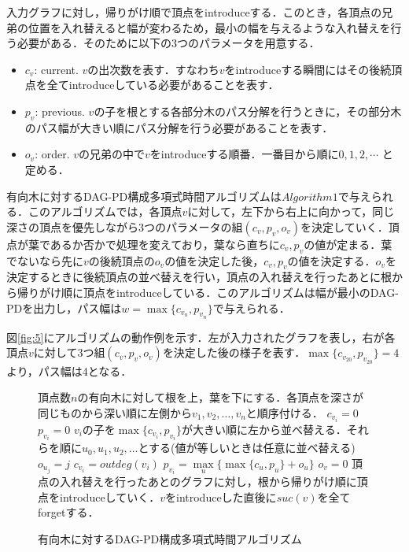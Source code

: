 \documentclass{kuisthesis}           %
\begin{document}
 入力グラフに対し，帰りがけ順で頂点をintroduceする．このとき，各頂点の兄弟の位置を入れ替えると幅が変わるため，最小の幅を与えるような入れ替えを行う必要がある．そのために以下の3つのパラメータを用意する．

 \begin{itemize}
     \item $c_v$: current. $v$の出次数を表す．すなわち$v$をintroduceする瞬間にはその後続頂点を全てintroduceしている必要があることを表す．
     \item $p_v$: previous. $v$の子を根とする各部分木のパス分解を行うときに，その部分木のパス幅が大きい順にパス分解を行う必要があることを表す．
     \item $o_v$: order. $v$の兄弟の中で$v$をintroduceする順番．一番目から順に$0, 1, 2, \cdots$ と定める．
 \end{itemize}
 
 有向木に対するDAG-PD構成多項式時間アルゴリズムは$Algorithm1$で与えられる．このアルゴリズムでは，各頂点$v$に対して，左下から右上に向かって，同じ深さの頂点を優先しながら3つのパラメータの組$(c_v, p_v, o_v)$を決定していく．頂点が葉であるか否かで処理を変えており，葉なら直ちに$c_v, p_v$の値が定まる．葉でないなら先に$v$の後続頂点の$o_v$の値を決定した後，$c_v, p_v$の値を決定する．$o_v$を決定するときに後続頂点の並べ替えを行い，頂点の入れ替えを行ったあとに根から帰りがけ順に頂点をintroduceしている．このアルゴリズムは幅が最小のDAG-PDを出力し，パス幅は$w= \max\{c_{v_n}, p_{v_n}\}$で与えられる．

 図\ref{fig:5}にアルゴリズムの動作例を示す．左が入力されたグラフを表し，右が各頂点$v$に対して3つ組$(c_v, p_v, o_v)$を決定した後の様子を表す．$\max\{c_{v_{20}}, p_{v_{20}}\}=4$より，パス幅は4となる．
 
 \begin{figure}[!t]
 \begin{algorithm}[H]
    \caption{有向木に対するDAG-PD構成多項式時間アルゴリズム}
    \label{alg1}
    \begin{algorithmic}[1]    %
    \State 頂点数$n$の有向木に対して根を上，葉を下にする．各頂点を深さが同じものから深い順に左側から$v_1, v_2,   \ldots, v_n$と順序付ける．
    \State $c_{v_i} = 0$
    \State $p_{v_i} = 0$
    \Else
    \State $v_i$の子を$ \max\{c_{v_i}, p_{v_i}\}$が大きい順に左から並べ替える．それらを順に$u_0, u_1, u_2,  \ldots $とする(値が等しいときは任意に並べ替える)
    \State $o_{u_j} = j$
    \EndFor
    \State $c_{v_i} = outdeg(v_i)$
    \State $p_{v_i}= \underset{u}{\max}\{ \max\{c_u, p_u\}+o_u\}$
    \State $o_v=0$
    \EndIf
    \EndIf
    \EndFor
    \State 頂点の入れ替えを行ったあとのグラフに対し，根から帰りがけ順に頂点をintroduceしていく．$v$をintroduceした直後に$suc(v)$を全てforgetする．
    \end{algorithmic}
 \end{algorithm}
 \end{figure}
\end{document}
